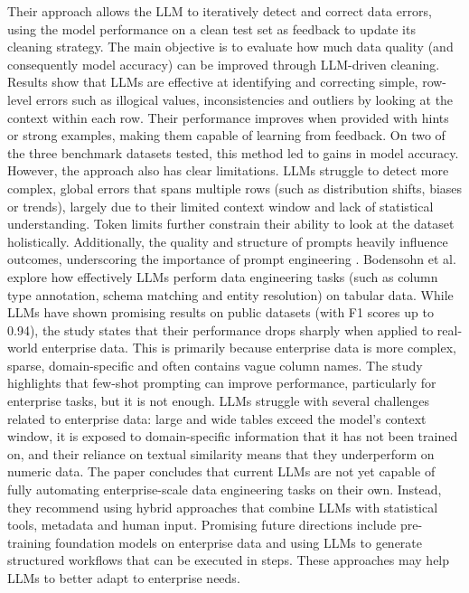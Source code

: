 Their approach allows the LLM to iteratively detect and correct data errors, using the model performance on a clean test set as feedback to update its cleaning strategy. 
The main objective is to evaluate how much data quality (and consequently model accuracy) can be improved through LLM-driven cleaning. 
Results show that LLMs are effective at identifying and correcting simple, row-level errors such as illogical values, inconsistencies and outliers by looking at the context within each row. 
Their performance improves when provided with hints or strong examples, making them capable of learning from feedback. 
On two of the three benchmark datasets tested, this method led to gains in model accuracy. 
However, the approach also has clear limitations. 
LLMs struggle to detect more complex, global errors that spans multiple rows (such as distribution shifts, biases or trends), largely due to their limited context window and lack of statistical understanding. 
Token limits further constrain their ability to look at the dataset holistically. Additionally, the quality and structure of prompts heavily influence outcomes, underscoring the importance of prompt engineering \cite{FMDATACLEANING, LLMDATAPREP}. 
\newline\newline
Bodensohn et al. \cite{CHALLENGES} explore how effectively LLMs perform data engineering tasks (such as column type annotation, schema matching and entity resolution) on tabular data. 
While LLMs have shown promising results on public datasets (with F1 scores up to 0.94), the study states that their performance drops sharply when applied to real-world enterprise data. 
This is primarily because enterprise data is more complex, sparse, domain-specific and often contains vague column names. 
The study highlights that few-shot prompting can improve performance, particularly for enterprise tasks, but it is not enough. 
LLMs struggle with several challenges related to enterprise data: large and wide tables exceed the model's context window, it is exposed to domain-specific information that it has not been trained on, and their reliance on textual similarity means that they underperform on numeric data. 
The paper concludes that current LLMs are not yet capable of fully automating enterprise-scale data engineering tasks on their own. 
Instead, they recommend using hybrid approaches that combine LLMs with statistical tools, metadata and human input. 
Promising future directions include pre-training foundation models on enterprise data and using LLMs to generate structured workflows that can be executed in steps. 
These approaches may help LLMs to better adapt to enterprise needs.

